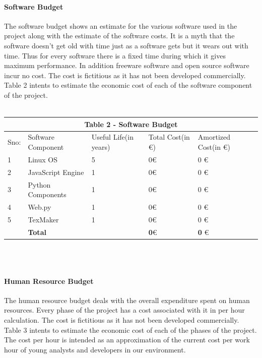 \paragraph{Software Budget}
The software budget shows an estimate for the various software used in the project along with
the estimate of the software costs. It is a myth that the software doesn’t get old with time just
as a software gets but it wears out with time. Thus for every software there is a fixed time
during which it gives maximum performance. In addition freeware software and open source
software incur no cost. The cost is fictitious as it has not been developed commercially. Table 2
intents to estimate the economic cost of each of the software component of the project.
\\ \\
\begin{tabular}{|p{1cm}||p{3cm}|p{2cm}|p{3cm}|p{3cm}|}
 \hline
 \multicolumn{5}{|c|}{Table 2 - Software Budget} \\
 \hline
 Sno: & Software Component&Useful Life(in years) &Total Cost(in \euro) &Amortized Cost(in \euro)\\
 \hline
1   & Linux OS  &5 &  0\euro  & 0 \euro \\
2   & JavaScript Engine  &1 &  0\euro  & 0 \euro \\
3   & Python Components  &1 &  0\euro  & 0 \euro \\
4   & Web.py  &1 &  0\euro  & 0 \euro \\
5   & TexMaker  &1 &  0\euro  & 0 \euro \\

\hline
\hline
   & \textbf{Total}  &  &  \textbf{0}\euro  & \textbf{0} \euro \\
 \hline
\end{tabular}
\\ \\ 
\paragraph{Human Resource Budget}
The human resource budget deals with the overall expenditure spent on human resources.
Every phase of the project has a cost associated with it in per hour calculation.
The cost is fictitious as it has not been developed commercially. Table 3 intents to estimate the
economic cost of each of the phases of the project. The cost per hour is intended as an
approximation of the current cost per work hour of young analysts and developers in our
environment.\\

